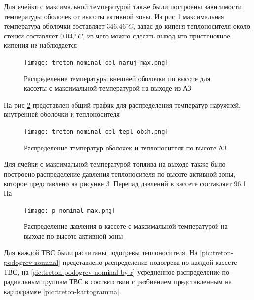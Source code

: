Для ячейки с максимальной температурой также были построены зависимости температуры оболочек от высоты активной зоны. Из рис \ref{pic:treton-t-obl-naruj-nominal-max} максимальная температура оболочки составляет $346.46 ^\circ C$, запас до кипеня теплоносителя около стенки составляет $0.04, ^\circ C$, из чего можно сделать вывод что пристеночное кипения не наблюдается

\begin{figure}[H]
	\begin{center}
		\texttt{[image: treton\_nominal\_obl\_naruj\_max.png]}
		\caption{Распределение температуры внешней оболочки по высоте для кассеты с максимальной температурой на выходе из АЗ}
		\label{pic:treton-t-obl-naruj-nominal-max} %
	\end{center}
\end{figure}

На рис \ref{pic:treton-obl-tepl-obsh-nominal} представлен  общий график для распределения температур наружней, внутренней оболочки и теплоносителя

\begin{figure}[H]
	\begin{center}
		\texttt{[image: treton\_nominal\_obl\_tepl\_obsh.png]}
		\caption{Распределение температур оболочек и теплоносителя по высоте АЗ}
		\label{pic:treton-obl-tepl-obsh-nominal} %
	\end{center}
\end{figure}

Для ячейки с максимальной температурой топлива на выходе также было построено распределение давления теплоносителя по высоте активной зоны, которое представлено на рисунке \ref{pic:treton-p-nominal-max}. Перепад давлений в кассете составляет 96.1 Па

\begin{figure}[H]
	\begin{center}
		\texttt{[image: p\_nominal\_max.png]}
		\caption{Распределение давления в кассете с максимальной температурой на выходе по высоте активной зоны}
		\label{pic:treton-p-nominal-max} %
	\end{center}
\end{figure}

Для каждой ТВС были расчитаны подогревы теплоносителя. На \ref{pic:treton-podogrev-nominal} представлено распределение подогрева по каждой кассете ТВС, на \ref{pic:treton-podogrev-nominal-by-r} усредненное распределение по радиальным группам ТВС в соответствии с разбиением представленным на картограмме \ref{pic:treton-kartogramma}.


